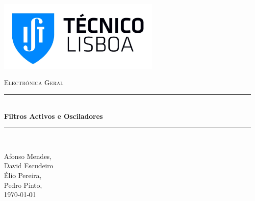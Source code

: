 \documentclass[a4paper,11pt]{report}
\newcommand{\HRule}{\rule{\linewidth}{0.5mm}}
\begin{document}
	
 
\begin{titlepage}

	\begin{flushleft}
	\includegraphics[width=0.6\textwidth]{./logo}~\\[4cm]
	\end{flushleft}

\begin{center}
\begin{spacing}{2}

	\textsc{\LARGE Electrónica Geral}\\[1cm]

\HRule \\[0.4cm]
{ \huge \bfseries Filtros Activos e Osciladores}\\[0.4cm]

\HRule \\[1.5cm]

\end{spacing}

	\vspace{2cm}

	Afonso Mendes, \\
	David Escudeiro \\
	Élio Pereira, \\
	Pedro Pinto, \\
	\vspace{4cm}
	\today 

\end{center}


\end{titlepage}


\tableofcontents %
\setcounter{page}{1} %
\end{document}
